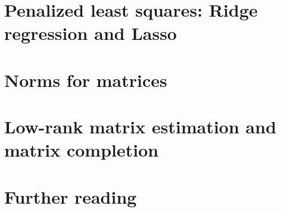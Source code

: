 \documentclass[11pt,nocut]{article}
\begin{document}
\section{Penalized least squares: Ridge regression and Lasso}

\section{Norms for matrices}

\section{Low-rank matrix estimation and matrix completion}



\section*{Further reading}


\vspace{1cm}
\centerline{}




\end{document}
